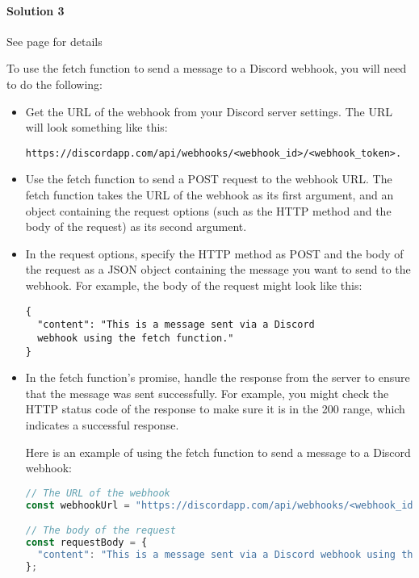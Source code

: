 {\label{sol:3}
\paragraph{Solution 3}

See page \pageref{ex:3} for details


To use the fetch function to send a message to a Discord webhook, you will need to do the following:
\begin{itemize}
\item Get the URL of the webhook from your Discord server settings. The URL will look something like this: \begin{verbatim}
https://discordapp.com/api/webhooks/<webhook_id>/<webhook_token>.
\end{verbatim}

\item Use the fetch function to send a POST request to the webhook URL. The fetch function takes the URL of the webhook as its first argument, and an object containing the request options (such as the HTTP method and the body of the request) as its second argument.

\item In the request options, specify the HTTP method as POST and the body of the request as a JSON object containing the message you want to send to the webhook. For example, the body of the request might look like this:

\begin{verbatim}
{
  "content": "This is a message sent via a Discord 
  webhook using the fetch function."
}
\end{verbatim}
\item In the fetch function's promise, handle the response from the server to ensure that the message was sent successfully. For example, you might check the HTTP status code of the response to make sure it is in the 200 range, which indicates a successful response.

Here is an example of using the fetch function to send a message to a Discord webhook:

\begin{lstlisting}[language=Javascript, caption=Post to webhook url using fetch]
// The URL of the webhook
const webhookUrl = "https://discordapp.com/api/webhooks/<webhook_id>/<webhook_token>";

// The body of the request
const requestBody = {
  "content": "This is a message sent via a Discord webhook using the fetch function."
};


\end{lstlisting}
\end{itemize}}
